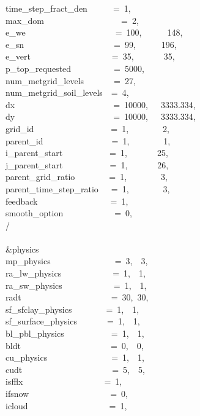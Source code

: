 time\_step\_fract\_den~~~~~~=~1,\\
max\_dom~~~~~~~~~~~~~~~~~~=~2,\\
e\_we~~~~~~~~~~~~~~~~~~~~~=~100,~~~~~~148,~~~~\\
e\_sn~~~~~~~~~~~~~~~~~~~~~=~99,~~~~~~196,~~~~\\
e\_vert~~~~~~~~~~~~~~~~~~~=~35,~~~~~~~35,~~~~\\
p\_top\_requested~~~~~~~~~~=~5000,\\
num\_metgrid\_levels~~~~~~~=~27,\\
num\_metgrid\_soil\_levels~~=~4,\\
dx~~~~~~~~~~~~~~~~~~~~~~~=~10000,~~~3333.334,\\
dy~~~~~~~~~~~~~~~~~~~~~~~=~10000,~~~3333.334,\\
grid\_id~~~~~~~~~~~~~~~~~~=~1,~~~~~~~~2,~~~~~~\\
parent\_id~~~~~~~~~~~~~~~~=~1,~~~~~~~~1,~~~~~~\\
i\_parent\_start~~~~~~~~~~~=~1,~~~~~~~25,~~~~~~\\
j\_parent\_start~~~~~~~~~~~=~1,~~~~~~~26,~~~~~~\\
parent\_grid\_ratio~~~~~~~~=~1,~~~~~~~~3,~~~~~~\\
parent\_time\_step\_ratio~~~=~1,~~~~~~~~3,~~~~~~\\
feedback~~~~~~~~~~~~~~~~~=~1,\\
smooth\_option~~~~~~~~~~~~=~0,\\
/\\
\\
\&physics~~~~~~~~~~~~~~~~~\\
mp\_physics~~~~~~~~~~~~~~~=~3,~~3,~\\
ra\_lw\_physics~~~~~~~~~~~~=~1,~~1,~\\
ra\_sw\_physics~~~~~~~~~~~~=~1,~~1,~\\
radt~~~~~~~~~~~~~~~~~~~~~=~30,~30,\\
sf\_sfclay\_physics~~~~~~~~=~1,~~1,~\\
sf\_surface\_physics~~~~~~~=~1,~~1,~\\
bl\_pbl\_physics~~~~~~~~~~~=~1,~~1,~\\
bldt~~~~~~~~~~~~~~~~~~~~~=~0,~~0,~\\
cu\_physics~~~~~~~~~~~~~~~=~1,~~1,~\\
cudt~~~~~~~~~~~~~~~~~~~~~=~5,~~5,~\\
isfflx~~~~~~~~~~~~~~~~~~~=~1,\\
ifsnow~~~~~~~~~~~~~~~~~~~=~0,\\
icloud~~~~~~~~~~~~~~~~~~~=~1,\\
